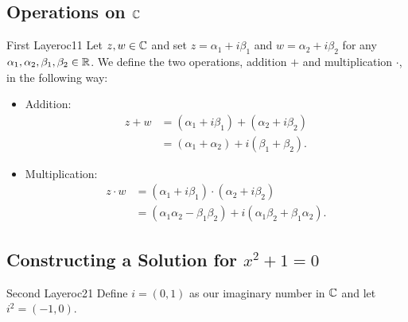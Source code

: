 \documentclass[a4paper]{article}
\begin{document}
    
\subsection*{Operations on \( \mathbb{C} \)}

\begin{ocg}{First Layer}{oc1}{1}
    Let \( z,w \in \mathbb{C}  \) and set \( z = {\alpha}_{1} + i {\beta}_{1} \) and \( w = {\alpha}_{2} + i {\beta}_{2} \) for any \( {\alpha}_{1}, {\alpha}_{2}, {\beta}_{1}, {\beta}_{2} \in \mathbb{R}  \). We define the two operations, addition \( +  \) and multiplication \( \cdot \), in the following way:    
    \begin{itemize}
        \item Addition:  
            \begin{align*}
                z + w &= ({\alpha}_{1} + i {\beta}_{1}) + ({\alpha}_{2} + i {\beta}_{2}) \\
                      &= ({\alpha}_{1} + {\alpha}_{2}) + i ({\beta}_{1} + {\beta}_{2}).
            \end{align*}
        \item Multiplication:
            \begin{align*}
                z \cdot w &= ({\alpha}_{1} + i {\beta}_{1}) \cdot ({\alpha}_{2} + i {\beta}_{2})  \\
                          &= ({\alpha}_{1} {\alpha}_{2} - {\beta}_{1} {\beta}_{2}) + i ({\alpha}_{1} {\beta}_{2} + {\beta}_{1} {\alpha}_{2}).
            \end{align*}
    \end{itemize}
\end{ocg} 


\subsection*{Constructing a Solution for \( x^{2} + 1 = 0  \)}

\begin{ocg}{Second Layer}{oc2}{1}
   Define \( i = (0,1) \) as our imaginary number in \( \mathbb{C}  \) and let \( i^{2} = (-1,0) \). 
\end{ocg} 


\subsection*{}
\end{document}
